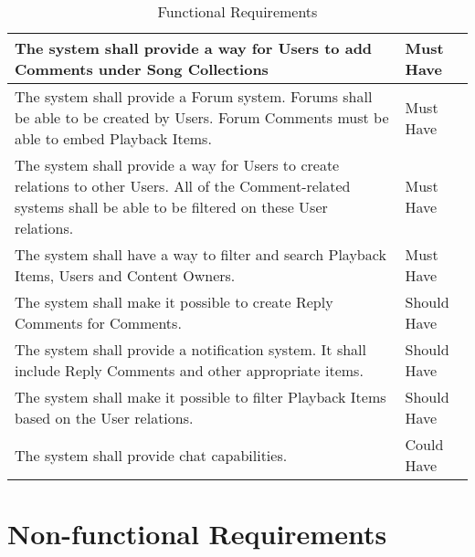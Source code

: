\begin{table}[h!]
\begin{tabular}{|p{12cm}|p{3cm}|}
        \hline
        The system shall provide a way for Users to add Comments under Song Collections                                                                                       & Must Have         \\
        \hline
        The system shall provide a Forum system. Forums shall be able to be created by Users. Forum Comments must be able to embed Playback Items. & Must Have \\
        \hline
        The system shall provide a way for Users to create relations to other Users. All of the Comment-related systems shall be able to be filtered on these User relations. & Must Have \\
        \hline
        The system shall have a way to filter and search Playback Items, Users and Content Owners. & Must Have \\
        \hline
        The system shall make it possible to create Reply Comments for Comments.                                                                                              & Should Have       \\
        \hline
        The system shall provide a notification system. It shall include Reply Comments and other appropriate items.                                                                                              & Should Have       \\
        \hline
        The system shall make it possible to filter Playback Items based on the User relations. & Should Have \\
        \hline
        The system shall provide chat capabilities.                                                                                                                           & Could Have        \\
        \hline
    \end{tabular}
    \caption{Functional Requirements}
\end{table}


\clearpage


\section{Non-functional Requirements}

